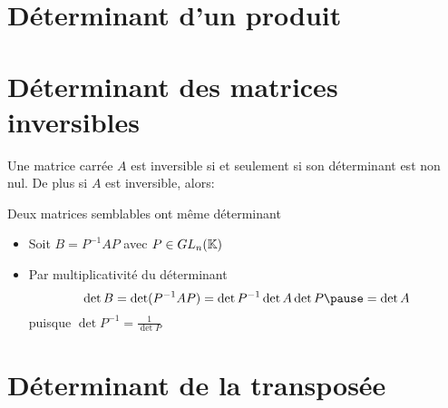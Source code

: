 \section{Déterminant d'un produit}

\begin{frame}

\begin{theoreme}
\end{theoreme}

\end{frame}





\section{Déterminant des matrices inversibles}

\begin{frame}

\begin{theoreme} 
Une matrice carrée $A$ est inversible si et seulement si son
déterminant est non nul\pause.  De plus si $A$ est inversible,  
alors: 
\end{theoreme}

\pause
\begin{exemple}
Deux  matrices semblables ont même déterminant

\begin{itemize}
  \item \pause Soit $B=P^{-1}AP$ avec $P\in GL_n(\mathbb{K})$ 
  \item\pause Par multiplicativité du déterminant
$$\det B=\det (P^{-1}AP)=\det P^{-1}\det A\det P \pause =\det A$$
puisque $\det P^{-1}=\frac{1}{\det P}$
\end{itemize}
\end{exemple}

\end{frame}


\section{Déterminant de la transposée}

